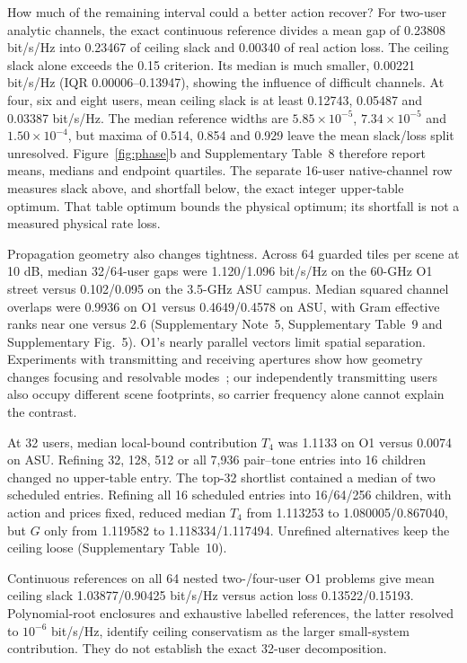 \documentclass[lineno,pdflatex,sn-nature]{sn-jnl}
\begin{document}
How much of the remaining interval could a better action recover? For two-user analytic channels, the exact continuous reference divides a mean gap of 0.23808 bit/s/Hz into 0.23467 of ceiling slack and 0.00340 of real action loss. The ceiling slack alone exceeds the 0.15 criterion. Its median is much smaller, 0.00221 bit/s/Hz (IQR 0.00006--0.13947), showing the influence of difficult channels. At four, six and eight users, mean ceiling slack is at least 0.12743, 0.05487 and 0.03387 bit/s/Hz. The median reference widths are \(5.85\times10^{-5}\), \(7.34\times10^{-5}\) and \(1.50\times10^{-4}\), but maxima of 0.514, 0.854 and 0.929 leave the mean slack/loss split unresolved. Figure~\ref{fig:phase}b and Supplementary Table~8 therefore report means, medians and endpoint quartiles. The separate 16-user native-channel row measures slack above, and shortfall below, the exact integer upper-table optimum. That table optimum bounds the physical optimum; its shortfall is not a measured physical rate loss.


Propagation geometry also changes tightness. Across 64 guarded tiles per scene at 10 dB, median 32/64-user gaps were 1.120/1.096 bit/s/Hz on the 60-GHz O1 street versus 0.102/0.095 on the 3.5-GHz ASU campus. Median squared channel overlaps were 0.9936 on O1 versus 0.4649/0.4578 on ASU, with Gram effective ranks near one versus 2.6 (Supplementary Note~5, Supplementary Table~9 and Supplementary Fig.~5). O1's nearly parallel vectors limit spatial separation. Experiments with transmitting and receiving apertures show how geometry changes focusing and resolvable modes~\cite{kludze2026,shenoam2026}; our independently transmitting users also occupy different scene footprints, so carrier frequency alone cannot explain the contrast.

At 32 users, median local-bound contribution \(T_4\) was 1.1133 on O1 versus 0.0074 on ASU. Refining 32, 128, 512 or all 7,936 pair--tone entries into 16 children changed no upper-table entry. The top-32 shortlist contained a median of two scheduled entries. Refining all 16 scheduled entries into 16/64/256 children, with action and prices fixed, reduced median \(T_4\) from 1.113253 to 1.080005/0.867040, but \(G\) only from 1.119582 to 1.118334/1.117494. Unrefined alternatives keep the ceiling loose (Supplementary Table~10).

Continuous references on all 64 nested two-/four-user O1 problems give mean ceiling slack 1.03877/0.90425 bit/s/Hz versus action loss 0.13522/0.15193. Polynomial-root enclosures and exhaustive labelled references, the latter resolved to \(10^{-6}\) bit/s/Hz, identify ceiling conservatism as the larger small-system contribution. They do not establish the exact 32-user decomposition.
\end{document}
